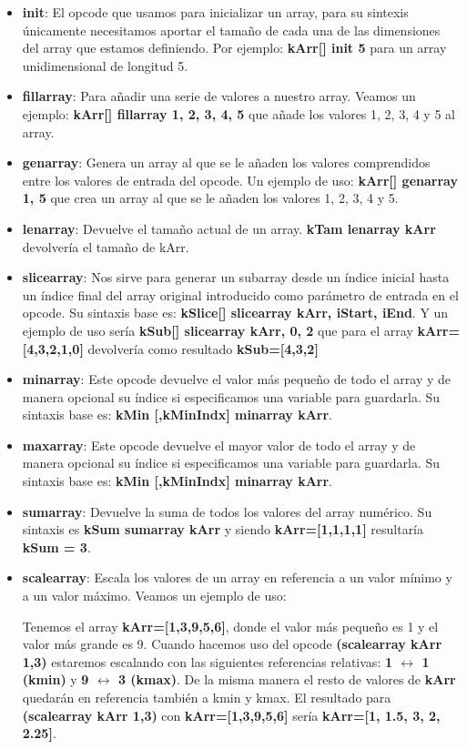\begin{itemize}
 \item \textbf{init}: El opcode que usamos para inicializar un array, para su sintexis únicamente necesitamos aportar el tamaño de cada una de las dimensiones del array que estamos definiendo. Por ejemplo: \textbf{kArr[]   init 5} para un array unidimensional de longitud 5.
 \item \textbf{fillarray}: Para añadir una serie de valores a nuestro array. Veamos un ejemplo: \textbf{kArr[] fillarray 1, 2, 3, 4, 5} que añade los valores 1, 2, 3, 4 y 5 al array.
 \item \textbf{genarray}: Genera un array al que se le añaden los valores comprendidos entre los valores de entrada del opcode. Un ejemplo de uso: \textbf{kArr[] genarray   1, 5} que crea un array al que se le añaden los valores 1, 2, 3, 4 y 5.
 \item \textbf{lenarray}: Devuelve el tamaño actual de un array. \textbf{kTam  lenarray  kArr} devolvería el tamaño de kArr. 
 \item \textbf{slicearray}: Nos sirve para generar un subarray desde un índice inicial hasta un índice final del array original introducido como parámetro de entrada en el opcode. Su sintaxis base es: \textbf{kSlice[] slicearray kArr, iStart, iEnd}. Y un ejemplo de uso sería \textbf{kSub[]  slicearray kArr, 0, 2} que para el array \textbf{kArr=[4,3,2,1,0]} devolvería como resultado \textbf{kSub=[4,3,2]}
 \item \textbf{minarray}: Este opcode devuelve el valor más pequeño de todo el array y de manera opcional su índice si especificamos una variable para guardarla. Su sintaxis base  es: \textbf{kMin [,kMinIndx] minarray kArr}.
 \item \textbf{maxarray}: Este opcode devuelve el mayor valor de todo el array y de manera opcional su índice si especificamos una variable para guardarla. Su sintaxis base  es: \textbf{kMin [,kMinIndx] minarray kArr}.
 \item \textbf{sumarray}: Devuelve la suma de todos los valores del array numérico. Su sintaxis es \textbf{kSum sumarray kArr} y siendo \textbf{kArr=[1,1,1,1]} resultaría \textbf{kSum = 3}.
 \item \textbf{scalearray}: Escala los valores de un array en referencia a un valor mínimo y a un valor máximo. Veamos un ejemplo de uso: 
  

Tenemos el array \textbf{kArr=[1,3,9,5,6]}, donde el valor más pequeño es 1 y el valor más grande es 9. Cuando hacemos uso del opcode \textbf{(scalearray kArr 1,3)} estaremos escalando con las siguientes referencias relativas: \textbf{1 $\leftrightarrow$ 1 (kmin)} y \textbf{9 $\leftrightarrow$ 3 (kmax)}. De la misma manera el resto de valores de \textbf{kArr} quedarán en referencia también a kmin y kmax. El resultado para \textbf{(scalearray kArr 1,3)} con \textbf{kArr=[1,3,9,5,6]} sería  \textbf{kArr=[1, 1.5, 3, 2, 2.25]}.


\end{itemize}

